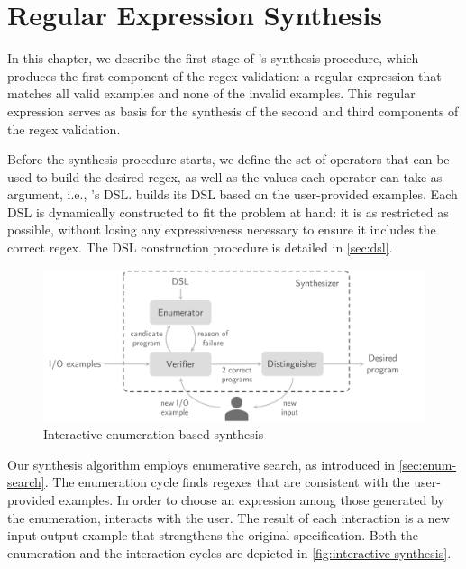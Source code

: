 \chapter{Regular Expression Synthesis}\label{chap:regex-synthesis}

In this chapter, we describe the first stage of \Forest{}'s synthesis procedure, which produces the first component of the regex validation: a regular expression that matches all valid examples and none of the invalid examples. This regular expression serves as basis for the synthesis of the second and third components of the regex validation.


Before the synthesis procedure starts, we define the set of operators that can be used to build the desired regex, as well as the values each operator can take as argument, i.e., \Forest{}'s \ac{DSL}. \Forest{} builds its DSL based on the user-provided examples. Each DSL is dynamically constructed to fit the problem at hand: it is as restricted as possible, without losing any expressiveness necessary to ensure it includes the correct regex. The DSL construction procedure is detailed in \autoref{sec:dsl}.

\begin{figure}[t]
    \centering
    \includegraphics[scale=.35]{pictures/interactive_synthesis.pdf}
    \caption{Interactive enumeration-based synthesis}
    \label{fig:interactive-synthesis}
\end{figure}

Our synthesis algorithm employs enumerative search, as introduced in \autoref{sec:enum-search}. The enumeration cycle finds regexes that are consistent with the user-provided examples. In order to choose an expression among those generated by the enumeration,  \Forest{} interacts with the user. The result of each interaction is a new input-output example that strengthens the original specification. Both the enumeration and the interaction cycles are depicted in \autoref{fig:interactive-synthesis}.

